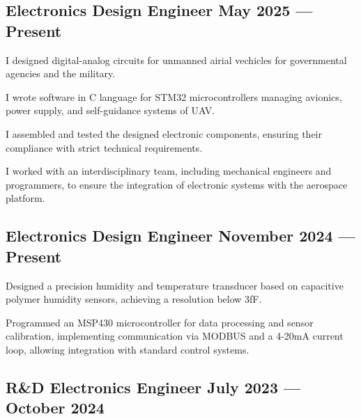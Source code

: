 
\subsection{{Electronics Design Engineer \hfill May 2025 --- Present}}

\begin{zitemize}
    \item I designed digital-analog circuits for unmanned airial vechicles for governmental agencies and the military.
    \item I wrote software in C language for STM32 microcontrollers managing avionics, power supply, and self-guidance systems of UAV.
    \item I assembled and tested the designed electronic components, ensuring their compliance with strict technical requirements.
    \item I worked with an interdisciplinary team, including mechanical engineers and programmers, to ensure the integration of electronic systems with the aerospace platform.
\end{zitemize}


\subsection{{Electronics Design Engineer \hfill November 2024 --- Present}}
\begin{zitemize}
    \item Designed a precision humidity and temperature transducer based on capacitive polymer humidity sensors, achieving a resolution below 3fF.
    \item Programmed an MSP430 microcontroller for data processing and sensor calibration, implementing communication via MODBUS and a 4-20mA current loop, allowing integration with standard control systems.
\end{zitemize}


\subsection{{R\&D Electronics Engineer \hfill July 2023 --- October 2024}}

